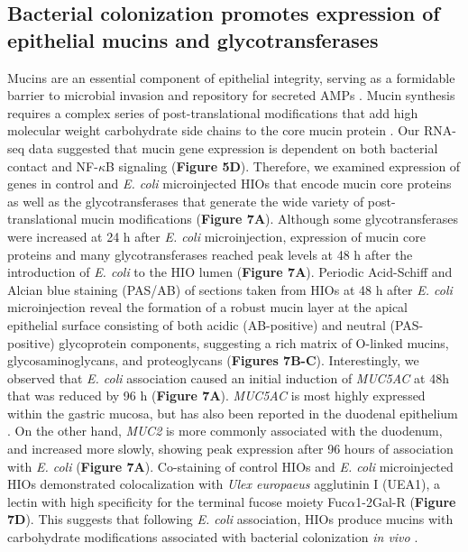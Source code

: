\documentclass[9pt,lineo]{elife}
\begin{document}
\subsection*{{\bfseries\sffamily } Bacterial colonization promotes expression of epithelial mucins and glycotransferases}
\label{sec:orgheadline9}
Mucins are an essential component of epithelial integrity, serving as a formidable barrier to microbial invasion and repository for secreted AMPs \citep{Bergstrom:2013,Cornick:2015,Johansson:2016,Kim:2010}. Mucin synthesis requires a complex series of post-translational modifications that add high molecular weight carbohydrate side chains to the core mucin protein \citep{varki2017essentials}. Our RNA-seq data suggested that mucin gene expression is dependent on both bacterial contact and NF-\(\kappa\)B signaling (\textbf{Figure 5D}). Therefore, we examined expression of genes in control and \emph{E. coli} microinjected HIOs that encode mucin core proteins as well as the glycotransferases that generate the wide variety of post-translational mucin modifications (\textbf{Figure 7A}). Although some glycotransferases were increased at 24 h after \emph{E. coli} microinjection, expression of mucin core proteins and many glycotransferases reached peak levels at 48 h after the introduction of \emph{E. coli} to the HIO lumen (\textbf{Figure 7A}). Periodic Acid-Schiff and Alcian blue staining (PAS/AB) of sections taken from HIOs at 48 h after \emph{E. coli} microinjection reveal the formation of a robust mucin layer at the apical epithelial surface consisting of both acidic (AB-positive) and neutral (PAS-positive) glycoprotein components, suggesting a rich matrix of O-linked mucins, glycosaminoglycans, and proteoglycans (\textbf{Figures 7B-C}). Interestingly, we observed that \emph{E. coli} association caused an initial induction of \emph{MUC5AC} at 48h that was reduced by 96 h (\textbf{Figure 7A}). \emph{MUC5AC} is most highly expressed within the gastric mucosa, but has also been reported in the duodenal epithelium \citep{Buisine:1998,Buisine:2001,Rodriguez-Pineiro:2013}. On the other hand, \emph{MUC2} is more commonly associated with the duodenum, and increased more slowly, showing peak expression after 96 hours of association with \emph{E. coli} (\textbf{Figure 7A}). Co-staining of control HIOs and \emph{E. coli} microinjected HIOs demonstrated colocalization with \emph{Ulex europaeus} agglutinin I (UEA1), a lectin with high specificity for the terminal fucose moiety Fuc\(\alpha\)1-2Gal-R (\textbf{Figure 7D}). This suggests that following \emph{E. coli} association, HIOs produce mucins with carbohydrate modifications associated with bacterial colonization \emph{in vivo} \citep{Cash:2006,Hooper:1999,Goto:2014}.
\end{document}
